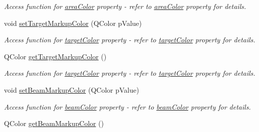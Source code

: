 \begin{DoxyCompactItemize}
\begin{DoxyCompactList}\small\item\em Access function for \hyperlink{classQEImage_ad44e666dbc8ceadc207a25494be80762}{areaColor} property -\/ refer to \hyperlink{classQEImage_ad44e666dbc8ceadc207a25494be80762}{areaColor} property for details. \end{DoxyCompactList}\item 
\hypertarget{classQEImage_add4987ee1d70b12056f678a39f00ce61}{
void \hyperlink{classQEImage_add4987ee1d70b12056f678a39f00ce61}{setTargetMarkupColor} (QColor pValue)}
\label{classQEImage_add4987ee1d70b12056f678a39f00ce61}

\begin{DoxyCompactList}\small\item\em Access function for \hyperlink{classQEImage_a1665fe2a8c463babc9045f3470d0b161}{targetColor} property -\/ refer to \hyperlink{classQEImage_a1665fe2a8c463babc9045f3470d0b161}{targetColor} property for details. \end{DoxyCompactList}\item 
\hypertarget{classQEImage_ab111436e92f83e60c524ff573f3b7094}{
QColor \hyperlink{classQEImage_ab111436e92f83e60c524ff573f3b7094}{getTargetMarkupColor} ()}
\label{classQEImage_ab111436e92f83e60c524ff573f3b7094}

\begin{DoxyCompactList}\small\item\em Access function for \hyperlink{classQEImage_a1665fe2a8c463babc9045f3470d0b161}{targetColor} property -\/ refer to \hyperlink{classQEImage_a1665fe2a8c463babc9045f3470d0b161}{targetColor} property for details. \end{DoxyCompactList}\item 
\hypertarget{classQEImage_a5e53a08d0dfc87984059f139d77d1ad4}{
void \hyperlink{classQEImage_a5e53a08d0dfc87984059f139d77d1ad4}{setBeamMarkupColor} (QColor pValue)}
\label{classQEImage_a5e53a08d0dfc87984059f139d77d1ad4}

\begin{DoxyCompactList}\small\item\em Access function for \hyperlink{classQEImage_ae69b7be04428ccdad5dffceae756f98f}{beamColor} property -\/ refer to \hyperlink{classQEImage_ae69b7be04428ccdad5dffceae756f98f}{beamColor} property for details. \end{DoxyCompactList}\item 
\hypertarget{classQEImage_aed4bc13752d72302487171c08a0b1769}{
QColor \hyperlink{classQEImage_aed4bc13752d72302487171c08a0b1769}{getBeamMarkupColor} ()}
\label{classQEImage_aed4bc13752d72302487171c08a0b1769}


\end{DoxyCompactItemize}
